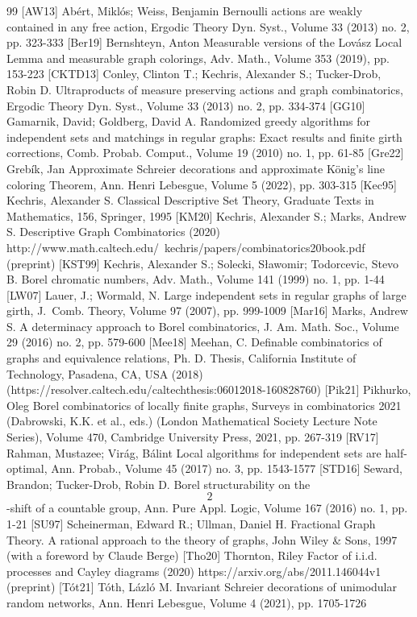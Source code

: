 \documentclass[10pt]{amsart}
\theoremstyle{definition}
\newcommand{\0}{\varnothing}
\begin{document}
\begin{thebibliography}{99}
 [AW13] Abért, Miklós; Weiss, Benjamin Bernoulli actions are weakly contained in any free action, Ergodic Theory Dyn. Syst., Volume 33 (2013) no. 2, pp. 323-333
 [Ber19] Bernshteyn, Anton Measurable versions of the Lovász Local Lemma and measurable graph colorings, Adv. Math., Volume 353 (2019), pp. 153-223
 [CKTD13] Conley, Clinton T.; Kechris, Alexander S.; Tucker-Drob, Robin D. Ultraproducts of measure preserving actions and graph combinatorics, Ergodic Theory Dyn. Syst., Volume 33 (2013) no. 2, pp. 334-374
 [GG10] Gamarnik, David; Goldberg, David A. Randomized greedy algorithms for independent sets and matchings in regular graphs: Exact results and finite girth corrections, Comb. Probab. Comput., Volume 19 (2010) no. 1, pp. 61-85
 [Gre22] Grebík, Jan Approximate Schreier decorations and approximate König’s line coloring Theorem, Ann. Henri Lebesgue, Volume 5 (2022), pp. 303-315
 [Kec95] Kechris, Alexander S. Classical Descriptive Set Theory, Graduate Texts in Mathematics, 156, Springer, 1995
 [KM20] Kechris, Alexander S.; Marks, Andrew S. Descriptive Graph Combinatorics (2020) http://www.math.caltech.edu/~kechris/papers/combinatorics20book.pdf (preprint)
 [KST99] Kechris, Alexander S.; Solecki, Sławomir; Todorcevic, Stevo B. Borel chromatic numbers, Adv. Math., Volume 141 (1999) no. 1, pp. 1-44
 [LW07] Lauer, J.; Wormald, N. Large independent sets in regular graphs of large girth, J. Comb. Theory, Volume 97 (2007), pp. 999-1009
 [Mar16] Marks, Andrew S. A determinacy approach to Borel combinatorics, J. Am. Math. Soc., Volume 29 (2016) no. 2, pp. 579-600
 [Mee18] Meehan, C. Definable combinatorics of graphs and equivalence relations, Ph. D. Thesis, California Institute of Technology, Pasadena, CA, USA (2018) (https://resolver.caltech.edu/caltechthesis:06012018-160828760)
 [Pik21] Pikhurko, Oleg Borel combinatorics of locally finite graphs, Surveys in combinatorics 2021 (Dabrowski, K.K. et al., eds.) (London Mathematical Society Lecture Note Series), Volume 470, Cambridge University Press, 2021, pp. 267-319
 [RV17] Rahman, Mustazee; Virág, Bálint Local algorithms for independent sets are half-optimal, Ann. Probab., Volume 45 (2017) no. 3, pp. 1543-1577
 [STD16] Seward, Brandon; Tucker-Drob, Robin D. Borel structurability on the $$2$$-shift of a countable group, Ann. Pure Appl. Logic, Volume 167 (2016) no. 1, pp. 1-21
 [SU97] Scheinerman, Edward R.; Ullman, Daniel H. Fractional Graph Theory. A rational approach to the theory of graphs, John Wiley \& Sons, 1997 (with a foreword by Claude Berge)
 [Tho20] Thornton, Riley Factor of i.i.d. processes and Cayley diagrams (2020) https://arxiv.org/abs/2011.146044v1 (preprint)
 [Tót21] Tóth, Lázló M. Invariant Schreier decorations of unimodular random networks, Ann. Henri Lebesgue, Volume 4 (2021), pp. 1705-1726
\end{thebibliography}
\end{document}
